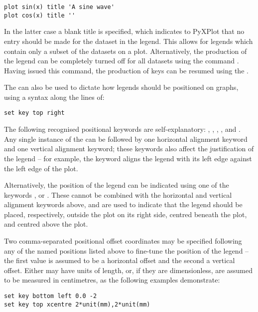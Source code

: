 \begin{verbatim}
plot sin(x) title 'A sine wave'
plot cos(x) title ''
\end{verbatim}

In the latter case a blank title is specified, which indicates to PyXPlot that
no entry should be made for the dataset in the legend. This allows for legends
which contain only a subset of the datasets on a plot. Alternatively, the
production of the legend can be completely turned off for all datasets using
the command . Having issued this command, the production of
keys can be resumed using the .

The  can also be used to dictate how legends should be
positioned on graphs, using a syntax along the lines of:

\begin{verbatim}
set key top right
\end{verbatim}

The following recognised positional keywords are self-explanatory:
, , , ,
 and . Any single instance of the
 can be followed by one horizontal alignment keyword and one
vertical alignment keyword; these keywords also affect the justification of the
legend -- for example, the keyword  aligns the legend with its
left edge against the left edge of the plot.

Alternatively, the position of the legend can be indicated using one of the
keywords ,  or . These cannot be
combined with the horizontal and vertical alignment keywords above, and are
used to indicate that the legend should be placed, respectively, outside the
plot on its right side, centred beneath the plot, and centred above the plot.

Two comma-separated positional offset coordinates may be specified following
any of the named positions listed above to fine-tune the position of the legend
-- the first value is assumed to be a horizontal offset and the second a
vertical offset. Either may have units of length, or, if they are
dimensionless, are assumed to be measured in centimetres, as the following
examples demonstrate:

\begin{verbatim}
set key bottom left 0.0 -2
set key top xcentre 2*unit(mm),2*unit(mm)
\end{verbatim}

